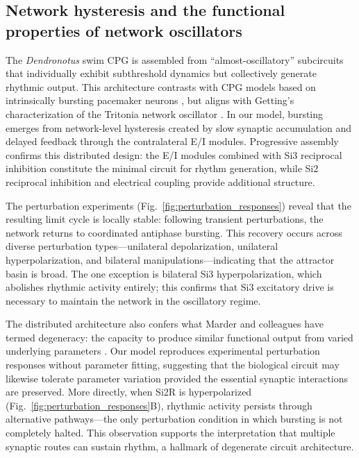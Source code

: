 \subsection*{Network hysteresis and the functional properties of network oscillators}

The \textit{Dendronotus} swim CPG is assembled from ``almost-oscillatory'' subcircuits that individually exhibit subthreshold dynamics but collectively generate rhythmic output.
This architecture contrasts with CPG models based on intrinsically bursting pacemaker neurons \cite{plant81, Rinzel87b, RL87}, but aligns with Getting's characterization of the Tritonia network oscillator \cite{Getting1989}.
In our model, bursting emerges from network-level hysteresis created by slow synaptic accumulation and delayed feedback through the contralateral E/I modules.
Progressive assembly confirms this distributed design: the E/I modules combined with Si3 reciprocal inhibition constitute the minimal circuit for rhythm generation, while Si2 reciprocal inhibition and electrical coupling provide additional structure.

The perturbation experiments (Fig.~\ref{fig:perturbation_responses}) reveal that the resulting limit cycle is locally stable: following transient perturbations, the network returns to coordinated antiphase bursting.
This recovery occurs across diverse perturbation types---unilateral depolarization, unilateral hyperpolarization, and bilateral manipulations---indicating that the attractor basin is broad.
The one exception is bilateral Si3 hyperpolarization, which abolishes rhythmic activity entirely; this confirms that Si3 excitatory drive is necessary to maintain the network in the oscillatory regime.

The distributed architecture also confers what Marder and colleagues have termed degeneracy: the capacity to produce similar functional output from varied underlying parameters \cite{MarderGoaillard2006, Prinz2004}.
Our model reproduces experimental perturbation responses without parameter fitting, suggesting that the biological circuit may likewise tolerate parameter variation provided the essential synaptic interactions are preserved.
More directly, when Si2R is hyperpolarized (Fig.~\ref{fig:perturbation_responses}B), rhythmic activity persists through alternative pathways---the only perturbation condition in which bursting is not completely halted.
This observation supports the interpretation that multiple synaptic routes can sustain rhythm, a hallmark of degenerate circuit architecture.

